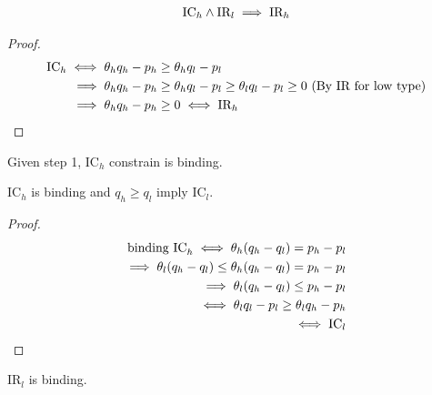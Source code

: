 \documentclass{article}
\begin{document}
   	\begin{proposition}[Step 1]
   		\begin{align}
   			\text{{IC}}_h \land \text{{IR}}_l \implies \text{{IR}}_h
   		\end{align}
   	\end{proposition}
   	
   	\begin{proof}
   		\begin{align}
   			\text{{IC}}_h \iff \theta_h q_h - p_h &\geq \theta_h q_l - p_l \\
   			\implies \theta_h q_h - p_h &\geq \theta_h q_l - p_l \geq \theta_l q_l - p_l \geq 0 \text{{ (By IR for low type)}}\\
   			\implies \theta_h q_h - p_h &\geq 0 \iff \text{{IR}}_h
   		\end{align}
   	\end{proof}
   	
   	\begin{proposition}[Step 2]
   		Given step 1, IC$_h$ constrain is binding.
   	\end{proposition}
   	
   	\begin{proposition}[Step 3]
   		IC$_h$ is binding and $q_h \geq q_l$ imply IC$_l$.
   	\end{proposition}
   	
   	\begin{proof}
   		\begin{align}
   			\text{{binding IC}}_h \iff \theta_h(q_h - q_l) = p_h - p_l \\
   			\implies \theta_l(q_h - q_l) \leq \theta_h(q_h - q_l) = p_h - p_l \\
   			\implies \theta_l(q_h - q_l) \leq p_h - p_l \\
   			\iff \theta_l q_l - p_l \geq \theta_l q_h - p_h \\
   			\iff \text{{IC}}_l
   		\end{align}
   	\end{proof}
   	
   	\begin{proposition}[Step 4]
   		IR$_l$ is binding.
   	\end{proposition}
   	
\end{document}
